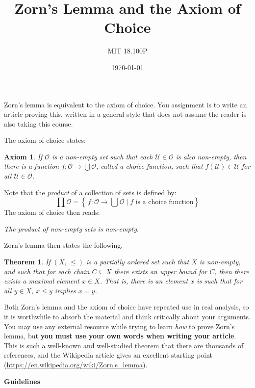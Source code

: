 \documentclass{article}
\title{Zorn's Lemma and the Axiom of Choice}
\author{MIT 18.100P}
\date{\today}
\newtheorem*{theorem*}{Theorem}
\newtheorem*{axiom*}{Axiom}
\begin{document}
    \maketitle
    Zorn's lemma is equivalent to the axiom of choice. You assignment is
    to write an article proving this, written in a general style that does
    not assume the reader is also taking this course.
    \par\hfill\par
    The axiom of choice states:
    \begin{axiom*}
        If $\mathcal{O}$ is a non-empty set such that each
        $\mathcal{U}\in\mathcal{O}$ is also non-empty, then there is a
        function $f:\mathcal{O}\rightarrow\bigcup\mathcal{O}$, called a
        \textit{choice function}, such that $f(\mathcal{U})\in\mathcal{U}$
        for all $\mathcal{U}\in\mathcal{O}$.
    \end{axiom*}
    Note that the \textit{product} of a collection of sets is defined by:
    \[
        \prod\mathcal{O}
        =\left\{\,
            f:\mathcal{O}\rightarrow\bigcup\mathcal{O}\;\Big|\;
                f\textrm{ is a choice function}
        \right\}
    \]
    The axiom of choice then reads:
    \begin{center}
        \textit{The product of non-empty sets is non-empty}.
    \end{center}
    Zorn's lemma then states the following.
    \begin{theorem*}
        If $(X,\,\leq)$ is a partially ordered set such that $X$ is non-empty,
        and such that for each chain $C\subseteq{X}$ there exists an upper
        bound for $C$, then there exists a maximal element
        $x\in{X}$. That is, there is an element $x$ is such that for all
        $y\in{X}$, $x\leq{y}$ implies $x=y$.
    \end{theorem*}
    Both Zorn's lemma and the axiom of choice have repeated use in real
    analysis, so it is worthwhile to absorb the material and think critically
    about your arguments. You may use any external resource while trying to
    learn \textit{how} to prove Zorn's lemma, but
    \textbf{you must use your own words when writing your article}.
    This is such a well-known and well-studied theorem that there are
    thousands of references, and the Wikipedia article gives an excellent
    starting point (\url{https://en.wikipedia.org/wiki/Zorn's_lemma}).
    \par\hfill\par
    \textbf{\Large{Guidelines}}
\end{document}

